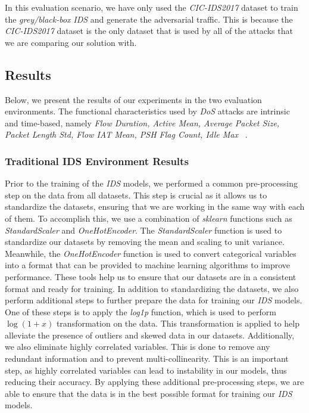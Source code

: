 In this evaluation scenario, we have only used the \textit{CIC-IDS2017} dataset to train the \textit{grey/black-box}
\textit{IDS} and generate the adversarial traffic.
This is because the \textit{CIC-IDS2017} dataset is the only dataset that is used by all of the attacks that we are
comparing our solution with.

\subsection{Results}\label{subsec:results}
Below, we present the results of our experiments in the two evaluation environments.
The functional characteristics used by \textit{DoS} attacks are intrinsic and time-based, namely \textit{Flow Duration,
    Active Mean, Average Packet Size, Packet Length Std, Flow IAT Mean, PSH Flag Count, Idle Max}
~\cite{CSE-CIC-IDS2018, usama2019generative}.

\subsubsection{Traditional IDS Environment Results}
Prior to the training of the \textit{IDS} models, we performed a common pre-processing step on the data from all
datasets.
This step is crucial as it allows us to standardize the datasets, ensuring that we are working in the same way with
each of them.
To accomplish this, we use a combination of \textit{sklearn} functions such as \textit{StandardScaler} and
\textit{OneHotEncoder}.
The \textit{StandardScaler} function is used to standardize our datasets by removing the mean and scaling to unit
variance.
Meanwhile, the \textit{OneHotEncoder} function is used to convert categorical variables into a format that can be
provided to machine learning algorithms to improve performance.
These tools help us to ensure that our datasets are in a consistent format and ready for training.
In addition to standardizing the datasets, we also perform additional steps to further prepare the data for training
our \textit{IDS} models.
One of these steps is to apply the \textit{log1p} function, which is used to perform $\log(1+x)$ transformation on the
data.
This transformation is applied to help alleviate the presence of outliers and skewed data in our datasets.
Additionally, we also eliminate highly correlated variables.
This is done to remove any redundant information and to prevent multi-collinearity.
This is an important step, as highly correlated variables can lead to instability in our models, thus reducing their
accuracy.
By applying these additional pre-processing steps, we are able to ensure that the data is in the best possible format
for training our \textit{IDS} models.

